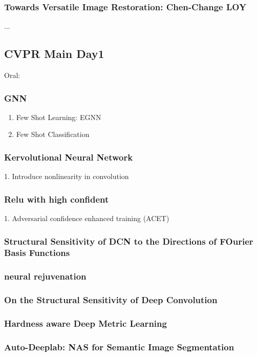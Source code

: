 \subsubsection{Towards Versatile Image Restoration: Chen-Change LOY}
...
\subsection{CVPR Main Day1}
Oral:\\
\subsubsection{GNN}
\begin{enumerate}
    \item Few Shot Learning: EGNN
    \item Few Shot Classification
\end{enumerate}
\subsubsection{Kervolutional Neural Network}
    1. Introduce nonlinearity in convolution\\
\subsubsection{Relu with high confident}
    1. Adversarial confidence enhanced training (ACET)\\
\subsubsection{Structural Sensitivity of DCN to the Directions of FOurier Basis Functions}
\subsubsection{neural rejuvenation}
\subsubsection{On the Structural Sensitivity of Deep Convolution}
\subsubsection{Hardness aware Deep Metric Learning}
\subsubsection{Auto-Deeplab: NAS for Semantic Image Segmentation}
